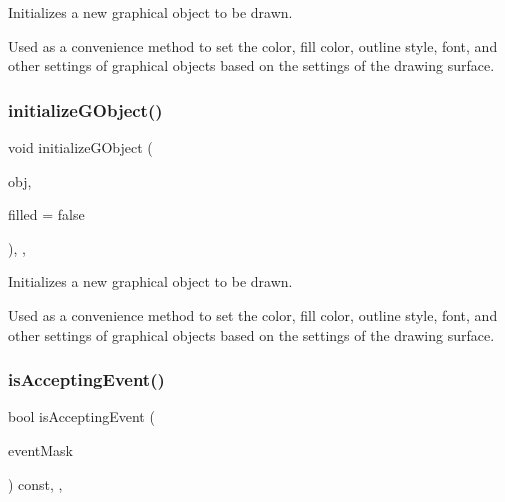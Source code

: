 Initializes a new graphical object to be drawn. 

Used as a convenience method to set the color, fill color, outline style, font, and other settings of graphical objects based on the settings of the drawing surface. \mbox{\label{classsgl_1_1GDrawingSurface_a43e6bc951980da061ddc40407daee227}} 
\subsubsection{\texorpdfstring{initialize\+G\+Object()}{initializeGObject()}\hspace{0.1cm}{\footnotesize\ttfamily [2/2]}}
{\footnotesize\ttfamily void initialize\+G\+Object (\begin{DoxyParamCaption}\item[{\mbox{\hyperlink{classsgl_1_1GObject}{G\+Object}} $\ast$}]{obj,  }\item[{bool}]{filled = {\ttfamily false} }\end{DoxyParamCaption})\hspace{0.3cm}{\ttfamily [protected]}, {\ttfamily [virtual]}, {\ttfamily [inherited]}}



Initializes a new graphical object to be drawn. 

Used as a convenience method to set the color, fill color, outline style, font, and other settings of graphical objects based on the settings of the drawing surface. \mbox{\label{classsgl_1_1GObservable_aeec1adc19aa0f33de62390686ee1382c}} 
\subsubsection{\texorpdfstring{is\+Accepting\+Event()}{isAcceptingEvent()}\hspace{0.1cm}{\footnotesize\ttfamily [1/3]}}
{\footnotesize\ttfamily bool is\+Accepting\+Event (\begin{DoxyParamCaption}\item[{int}]{event\+Mask }\end{DoxyParamCaption}) const\hspace{0.3cm}{\ttfamily [protected]}, {\ttfamily [virtual]}, {\ttfamily [inherited]}}



